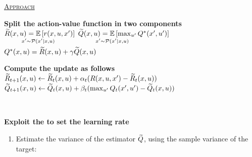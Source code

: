 \documentclass[portrait,a0paper,fontscale=0.312]{baposter}
\newcommand{\listhead}[1] {\textsc{\underline{#1}}}
\begin{document}
\begin{poster}
{\begin{center}
\vspace{-.25cm}
 \listhead{\Large Approach}\\
 \vspace{-.25cm}
\end{center}
\begin{minipage}[t]{0.5\textwidth}
\begin{center}
  \textbf{Split the action-value function in two components}\\
  \vspace{.25cm}
  $\Rtilde(x,u)=\underset{\strut\mathclap{x'\sim \Pmodel(x'|x,u)}}{\mathbb{E}}\left[ r(x,u,x')\right]$\hspace{1cm}
  $\Qtilde(x,u)=\underset{\strut\mathclap{x'\sim \Pmodel(x'|x,u)}}{\mathbb{E}}\left[\max_{u'} Q^*(x',u')\right]$\\
  \vspace{.25cm}
  $Q^*(x,u)=\widetilde{R}(x,u)+\gamma\widetilde{Q}(x,u)$
\end{center}
\end{minipage}
\begin{minipage}[t]{0.45\textwidth}
\begin{center}
  \textbf{Compute the update as follows}\\
  \vspace{.75cm}
  $\widetilde{R}_{t+1}(x,u) \leftarrow\widetilde{R}_t(x,u)+\alpha_t(R(x,u,x')-\widetilde{R}_t(x,u))$\\
  \vspace{.75cm}
  $\widetilde{Q}_{t+1}(x,u) \leftarrow\widetilde{Q}_t(x,u)+\beta_t(\max_{u'}Q_t(x',u')-\widetilde{Q}_t(x,u))$
\end{center}
\end{minipage}%
\\
\begin{center}
 \textbf{Exploit the  to set the learning rate}\\
\end{center}
\begin{minipage}[t]{\textwidth}
   \begin{enumerate}
   \item Estimate the variance of the estimator $\widetilde{Q}$, using the sample variance of the target:\\
   \vspace{-.75cm}
   \begin{center}
\end{center}
\end{enumerate}
\end{minipage}}
\end{poster}
\end{document}
